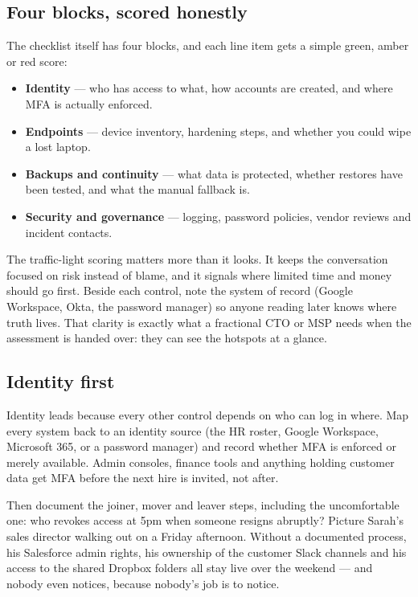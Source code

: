 \subsection{Four blocks, scored honestly}


The checklist itself has four blocks, and each line item gets a simple green, amber or red score:


\begin{itemize}[leftmargin=*]
\item \textbf{Identity} — who has access to what, how accounts are created, and where MFA is actually enforced.
\item \textbf{Endpoints} — device inventory, hardening steps, and whether you could wipe a lost laptop.
\item \textbf{Backups and continuity} — what data is protected, whether restores have been tested, and what the manual fallback is.
\item \textbf{Security and governance} — logging, password policies, vendor reviews and incident contacts.
\end{itemize}

The traffic-light scoring matters more than it looks. It keeps the conversation focused on risk instead of blame, and it signals where limited time and money should go first. Beside each control, note the system of record (Google Workspace, Okta, the password manager) so anyone reading later knows where truth lives. That clarity is exactly what a fractional CTO or MSP needs when the assessment is handed over: they can see the hotspots at a glance.



\subsection{Identity first}


Identity leads because every other control depends on who can log in where. Map every system back to an identity source (the HR roster, Google Workspace, Microsoft 365, or a password manager) and record whether MFA is enforced or merely available. Admin consoles, finance tools and anything holding customer data get MFA before the next hire is invited, not after.


Then document the joiner, mover and leaver steps, including the uncomfortable one: who revokes access at 5pm when someone resigns abruptly? Picture Sarah's sales director walking out on a Friday afternoon. Without a documented process, his Salesforce admin rights, his ownership of the customer Slack channels and his access to the shared Dropbox folders all stay live over the weekend — and nobody even notices, because nobody's job is to notice.


